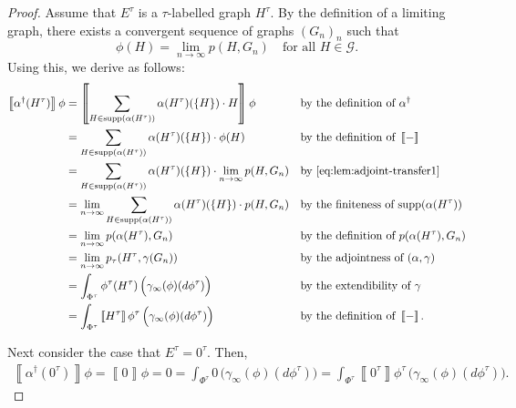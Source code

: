 \documentclass{article}
\newcommand*{\db}[1]{\left\llbracket #1 \right\rrbracket}
\newcommand*{\support}{\mathrm{supp}}
\begin{document}
\begin{proof}
  Assume that $E^\tau$ is a $\tau$-labelled graph $H^\tau$. By the definition of a limiting graph, there exists a convergent sequence of graphs $(G_n)_n$ such that 
  \begin{equation}
    \label{eq:lem:adjoint-transfer1}
    \phi(H) = \lim_{n \to \infty} p(H, G_n)  \quad\text{for all } H \in \mathcal{G}.
  \end{equation}
  Using this, we derive  as follows:
  \begin{align*}
    \db{\alpha^\dagger(H^\tau)}\phi 
    & {} = \db{\sum_{H \in \support(\alpha(H^\tau))} \alpha(H^\tau)(\{H\}) \cdot H}\phi
    && \text{by the definition of } \alpha^\dagger
    \\
    & {} = \sum_{H \in \support(\alpha(H^\tau))} \alpha(H^\tau)(\{H\}) \cdot \phi(H)
    && \text{by the definition of } \db{-}
    \\
    & {} = \sum_{H \in \support(\alpha(H^\tau))} \alpha(H^\tau)(\{H\}) \cdot \lim_{n \to \infty} p(H, G_n)
    && \text{by \Cref{eq:lem:adjoint-transfer1}}
    \\
    & {} = \lim_{n \to \infty} \sum_{H \in \support(\alpha(H^\tau))} \alpha(H^\tau)(\{H\}) \cdot p(H, G_n)
    && \text{by the finiteness of } \support(\alpha(H^\tau))
    \\
    & {} = \lim_{n \to \infty} p(\alpha(H^\tau), G_n)
    && \text{by the definition of } p(\alpha(H^\tau), G_n)
    \\
    & {} = \lim_{n \to \infty} p_\tau(H^\tau, \gamma(G_n))
    && \text{by the adjointness of } (\alpha,\gamma)
    \\
    & {} = \int_{\Phi^\tau} \phi^\tau(H^\tau) \, \Big(\gamma_\infty(\phi)(d\phi^\tau)\Big)
    && \text{by the extendibility of } \gamma
    \\
    & {} = \int_{\Phi^\tau} \db{H^\tau}\phi^\tau \, \Big(\gamma_\infty(\phi)(d\phi^\tau)\Big)
    && \text{by the definition of } \db{-}.
  \end{align*}

  Next consider the case that $E^\tau = 0^\tau$. Then, 
  \begin{align*}
    \db{\alpha^\dagger(0^\tau)}\phi 
    = \db{0}\phi
    = 0 
    = \int_{\Phi^\tau} 0 \, \Big(\gamma_\infty(\phi)(d\phi^\tau)\Big)
    = \int_{\Phi^\tau} \db{0^\tau}\phi^\tau \, \Big(\gamma_\infty(\phi)(d\phi^\tau)\Big).
  \end{align*}


\end{proof}
\end{document}
